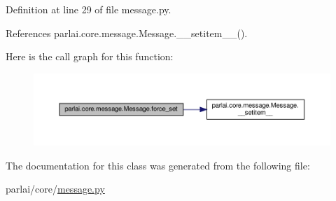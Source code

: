 Definition at line 29 of file message.\+py.



References parlai.\+core.\+message.\+Message.\+\_\+\+\_\+setitem\+\_\+\+\_\+().

Here is the call graph for this function\+:
\nopagebreak
\begin{figure}[H]
\begin{center}
\leavevmode
\includegraphics[width=350pt]{classparlai_1_1core_1_1message_1_1Message_acbafaa2540a6b2ca6513fe9db49a9291_cgraph}
\end{center}
\end{figure}


The documentation for this class was generated from the following file\+:\begin{DoxyCompactItemize}
\item 
parlai/core/\hyperlink{message_8py}{message.\+py}\end{DoxyCompactItemize}

